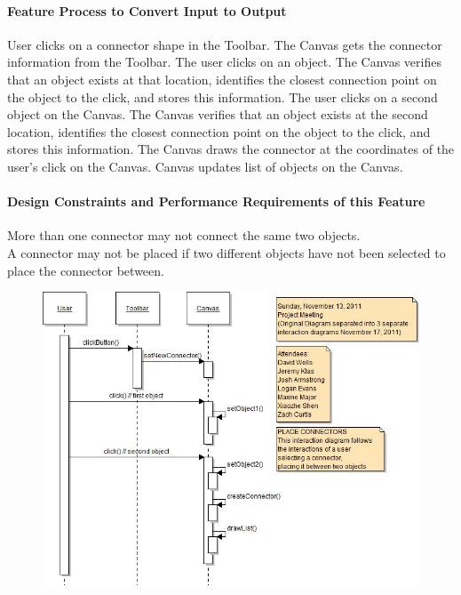 \documentclass[twoside,letterpaper]{article}
\begin{document}
{\paragraph{Feature Process to Convert Input to Output}
{\color{black}
User clicks on a connector shape in the Toolbar.  
The Canvas gets the connector information from the Toolbar.  
The user clicks on an object.
The Canvas verifies that an object exists at that location, identifies the closest connection point on the object to the click, and stores this information.
The user clicks on a second object on the Canvas.  
The Canvas verifies that an object exists at the second location, identifies the closest connection point on the object to the click, and stores this information.  
The Canvas draws the connector at the coordinates of the user{\textquoteright}s click on the Canvas.  
Canvas updates list of objects on the Canvas.  
}

\paragraph{Design Constraints and Performance Requirements of this Feature}
{\color{black}
More than one connector may not connect the same two objects.
\\A connector may not be placed if two different objects have not been selected to place the connector between.
}
\bigskip
\bigskip

\begin{figure}[h]
\centering
\includegraphics[width=5.0in]{IntNewConn.jpg}
\end{figure}

}
\end{document}
